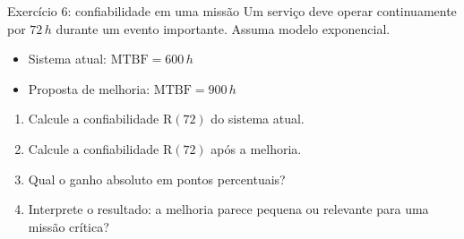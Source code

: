 \documentclass{beamer}
\newif\ifshowsolutions
\newcommand{\R}{\mathrm{R}}
\newcommand{\MTBF}{\mathrm{MTBF}}
\begin{document}
\begin{frame}{Exercício 6: confiabilidade em uma missão}
Um serviço deve operar continuamente por \(72\,h\) durante um evento importante.
Assuma modelo exponencial.

\begin{itemize}
  \item Sistema atual: \(\MTBF=600\,h\)
  \item Proposta de melhoria: \(\MTBF=900\,h\)
\end{itemize}

\begin{enumerate}
  \item Calcule a confiabilidade \(\R(72)\) do sistema atual.
  \item Calcule a confiabilidade \(\R(72)\) após a melhoria.
  \item Qual o ganho absoluto em pontos percentuais?
  \item Interprete o resultado: a melhoria parece pequena ou relevante para uma missão crítica?
\end{enumerate}
\end{frame}

\ifshowsolutions
\begin{frame}{Gabarito Exercício 6}
\small
Pelo modelo exponencial:
\[
\R(t)=e^{-t/\MTBF}
\]

\begin{itemize}
  \item Sistema atual:
  \[
  \R(72)=e^{-72/600}=e^{-0.12}\approx 0.8869
  \]
  Logo, aproximadamente \(\mathbf{88.69\%}\).

  \item Sistema melhorado:
  \[
  \R(72)=e^{-72/900}=e^{-0.08}\approx 0.9231
  \]
  Logo, aproximadamente \(\mathbf{92.31\%}\).

  \item Ganho absoluto:
  \[
  92.31\%-88.69\%=3.62 \text{ pontos percentuais}
  \]
\end{itemize}

\begin{block}{Interpretação}
Mesmo um ganho aparentemente pequeno em pontos percentuais pode ser relevante em
missões longas ou críticas, pois representa uma redução real na chance de falha durante a operação.
\end{block}
\end{frame}
\fi
\end{document}
